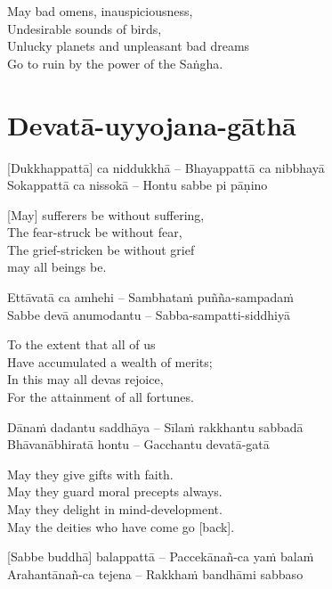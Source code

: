 \begin{english}
  May bad omens, inauspiciousness,\\
  Undesirable sounds of birds,\\
  Unlucky planets and unpleasant bad dreams\\
  Go to ruin by the power of the Saṅgha.
\end{english}

\suttaRef{[Trad]}

\section{Devatā-uyyojana-gāthā}
\label{devata-uyyojana-gatha}
[Dukkhappattā] ca niddukkhā – Bhayappattā ca nibbhayā\\
Sokappattā ca nissokā – Hontu sabbe pi pāṇino

\begin{english}
  [May] sufferers be without suffering,\\
  The fear-struck be without fear,\\
  The grief-stricken be without grief\\\relax
  [Thus] may all beings be.
\end{english}

Ettāvatā ca amhehi – Sambhataṁ puñña-sampadaṁ\\
Sabbe devā anumodantu
– Sabba-sampatti-siddhiyā

\begin{english}
  To the extent that all of us\\
  Have accumulated a wealth of merits;\\
  In this may all devas rejoice,\\
  For the attainment of all fortunes.
\end{english}

Dānaṁ dadantu saddhāya – Sīlaṁ rakkhantu sabbadā\\
Bhāvanābhiratā hontu – Gacchantu devatā-gatā

\begin{english}
  May they give gifts with faith.\\
  May they guard moral precepts always.\\
  May they delight in mind-development.\\
  May the deities who have come go [back].
\end{english}

[Sabbe buddhā] balappattā – Paccekānañ-ca yaṁ balaṁ\\
Arahantānañ-ca tejena – Rakkhaṁ bandhāmi sabbaso

